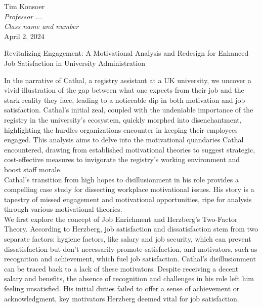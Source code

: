 \documentclass[12pt]{article}
\begin{document}
\begin{flushleft}

Tim Konsoer\\
\textit{Professor ...}\\
\textit{Class name and number}\\
April 2, 2024\\


\begin{center}
Revitalizing Engagement: A Motivational Analysis and Redesign for Enhanced Job Satisfaction in University Administration
\end{center}


\setlength{\parindent}{0.5in}

In the narrative of Cathal, a registry assistant at a UK university, we uncover a vivid illustration of the gap between what one expects from their job and the stark reality they face, leading to a noticeable dip in both motivation and job satisfaction. Cathal's initial zeal, coupled with the undeniable importance of the registry in the university's ecosystem, quickly morphed into disenchantment, highlighting the hurdles organizations encounter in keeping their employees engaged. This analysis aims to delve into the motivational quandaries Cathal encountered, drawing from established motivational theories to suggest strategic, cost-effective measures to invigorate the registry's working environment and boost staff morale.\\
Cathal's transition from high hopes to disillusionment in his role provides a compelling case study for dissecting workplace motivational issues. His story is a tapestry of missed engagement and motivational opportunities, ripe for analysis through various motivational theories.\\
We first explore the concept of Job Enrichment and Herzberg's Two-Factor Theory. According to Herzberg, job satisfaction and dissatisfaction stem from two separate factors: hygiene factors, like salary and job security, which can prevent dissatisfaction but don't necessarily promote satisfaction, and motivators, such as recognition and achievement, which fuel job satisfaction. Cathal's disillusionment can be traced back to a lack of these motivators. Despite receiving a decent salary and benefits, the absence of recognition and challenges in his role left him feeling unsatisfied. His initial duties failed to offer a sense of achievement or acknowledgment, key motivators Herzberg deemed vital for job satisfaction.\\

\end{flushleft}
\end{document}
